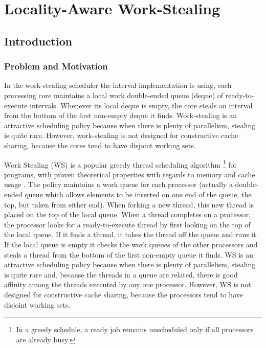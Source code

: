 
\part{Locality-Aware Work-Stealing}
\label{part:locality}

\chapter{Introduction}
\label{chap:locality-introduction}


\section{Problem and Motivation}
\label{sec:locality-intro-problem-and-motivation}


In the work-stealing scheduler the interval implementation is using,
each processing core maintains a local work double-ended queue (deque)
of ready-to-execute intervals. Whenever its local deque is empty, the
core steals an interval from the bottom of the first non-empty deque
it finds. Work-stealing is an attractive scheduling policy because
when there is plenty of parallelism, stealing is quite rare. However,
work-stealing is not designed for constructive cache sharing, because
the cores tend to have disjoint working sets.


Work Stealing (WS) is a popular greedy thread scheduling algorithm
\footnote{In a greedy schedule, a ready job remains unscheduled only
  if all processors are already busy.} for programs, with proven
theoretical properties with regards to memory and cache usage
\cite{Blumofe1998a, Blumofe1999, Acar2002}. The policy maintains a
work queue for each processor (actually a double-ended queue which
allows elements to be inserted on one end of the queue, the top, but
taken from either end). When forking a new thread, this new thread is
placed on the top of the local queue. When a thread completes on a
processor, the processor looks for a ready-to-execute thread by first
looking on the top of the local queue. If it finds a thread, it takes
the thread off the queue and runs it. If the local queue is empty it
checks the work queues of the other processors and steals a thread
from the bottom of the first non-empty queue it finds. WS is an
attractive scheduling policy because when there is plenty of
parallelism, stealing is quite rare and, because the threads in a
queue are related, there is good affinity among the threads executed
by any one processor. However, WS is not designed for constructive
cache sharing, because the processors tend to have disjoint working
sets.


